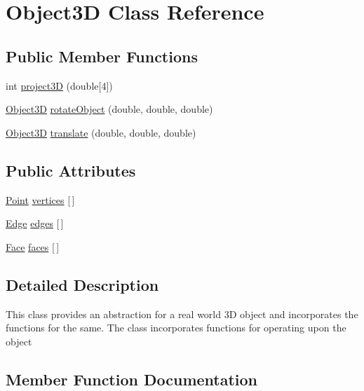 \hypertarget{class_object3_d}{}\section{Object3D Class Reference}
\label{class_object3_d}
\subsection*{Public Member Functions}
\begin{DoxyCompactItemize}
\item 
int \hyperlink{class_object3_d_a17e177a936a71e0a5599ce7ca76bae78}{project3D} (double\mbox{[}4\mbox{]})
\item 
\hyperlink{class_object3_d}{Object3D} \hyperlink{class_object3_d_a476b3de610cb30be0b050b4701ba4701}{rotate\+Object} (double, double, double)
\item 
\hyperlink{class_object3_d}{Object3D} \hyperlink{class_object3_d_afb299c53794e9f4fb708efbde24c9a21}{translate} (double, double, double)
\end{DoxyCompactItemize}
\subsection*{Public Attributes}
\begin{DoxyCompactItemize}
\item 
\hyperlink{class_point}{Point} \hyperlink{class_object3_d_a23cc82ea4ef0af8e0e22871bdbdba6c6}{vertices} \mbox{[}$\,$\mbox{]}
\item 
\hyperlink{class_edge}{Edge} \hyperlink{class_object3_d_ad93f210748663a4d0aaa89287dee3dae}{edges} \mbox{[}$\,$\mbox{]}
\item 
\hyperlink{class_face}{Face} \hyperlink{class_object3_d_a4cc7f57059a990a8573a7644a4d3ab2a}{faces} \mbox{[}$\,$\mbox{]}
\end{DoxyCompactItemize}


\subsection{Detailed Description}
This class provides an abstraction for a real world 3D object and incorporates the functions for the same. The class incorporates functions for operating upon the object 

\subsection{Member Function Documentation}
